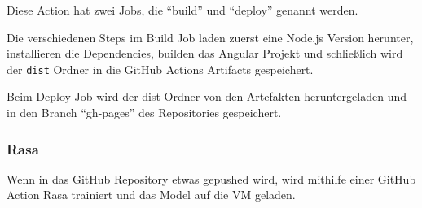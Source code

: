 Diese Action hat zwei Jobs, die ``build'' und ``deploy'' genannt werden.

Die verschiedenen Steps im Build Job laden zuerst eine Node.js Version herunter, installieren die Dependencies, builden das Angular Projekt und schließlich wird der \texttt{dist} Ordner in die GitHub Actions Artifacts gespeichert.

Beim Deploy Job wird der dist Ordner von den Artefakten heruntergeladen und in den Branch ``gh-pages'' des Repositories gespeichert.

\subsubsection{Rasa}

Wenn in das GitHub Repository etwas gepushed wird, wird mithilfe einer GitHub Action Rasa trainiert und das Model auf die VM geladen.

